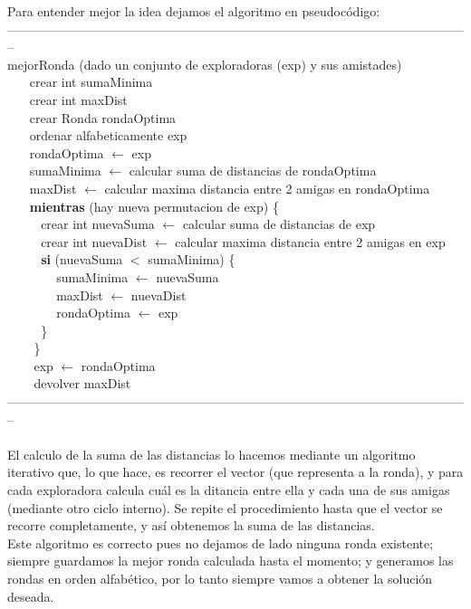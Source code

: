 Para entender mejor la idea dejamos el algoritmo en pseudocódigo:\\   
--------------------------------------------------------------------------------------------------------------\\
mejorRonda (dado un conjunto de exploradoras (exp) y sus amistades) \\
$~~~~~~~~$crear int sumaMinima \\
$~~~~~~~~$crear int maxDist \\
$~~~~~~~~$crear Ronda rondaOptima  \\
$~~~~~~~~$ordenar alfabeticamente exp \\
$~~~~~~~~$rondaOptima $\leftarrow$ exp \\
$~~~~~~~~$sumaMinima $\leftarrow$ calcular suma de distancias de rondaOptima  \\
$~~~~~~~~$maxDist $\leftarrow$ calcular maxima distancia entre 2 amigas en rondaOptima \\
$~~~~~~~~$\textbf{mientras} (hay nueva permutacion de exp) \{ \\
$~~~~~~~~~~~~$crear int nuevaSuma $\leftarrow$ calcular suma de distancias de exp  \\
$~~~~~~~~~~~~$crear int nuevaDist $\leftarrow$ calcular maxima distancia entre 2 amigas en exp  \\
$~~~~~~~~~~~~$\textbf{si} (nuevaSuma $<$ sumaMinima) \{ \\
$~~~~~~~~~~~~~~~~$ sumaMinima $\leftarrow$ nuevaSuma \\
$~~~~~~~~~~~~~~~~$ maxDist $\leftarrow$ nuevaDist \\
$~~~~~~~~~~~~~~~~$ rondaOptima $\leftarrow$ exp \\
$~~~~~~~~~~~~$\} \\
$~~~~~~~~$ \} \\
$~~~~~~~~$ exp $\leftarrow$ rondaOptima\\
$~~~~~~~~$ devolver maxDist\\
--------------------------------------------------------------------------------------------------------------\\ \\
El calculo de la suma de las distancias lo hacemos mediante un algoritmo iterativo que, lo que hace, es recorrer el vector
(que representa a la ronda), y para cada exploradora calcula cuál es la ditancia entre ella y cada una de sus amigas (mediante 
otro ciclo interno). Se repite el procedimiento hasta que el vector se recorre completamente, y así obtenemos la suma de las distancias.
\\
Este algoritmo es correcto pues no dejamos de lado ninguna ronda existente; siempre guardamos la mejor ronda calculada hasta el momento; y
generamos las rondas en orden alfabético, por lo tanto siempre vamos a obtener la solución deseada.


